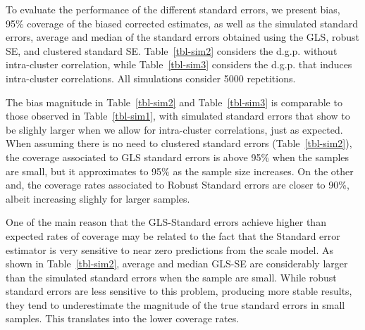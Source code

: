 \documentclass[
  12pt,
  oneside]{article}
\begin{document}
To evaluate the performance of the different standard errors, we present
bias, 95\% coverage of the biased corrected estimates, as well as the
simulated standard errors, average and median of the standard errors
obtained using the GLS, robust SE, and clustered standard SE.
Table~\ref{tbl-sim2} considers the d.g.p. without intra-cluster
correlation, while Table~\ref{tbl-sim3} considers the d.g.p. that
induces intra-cluster correlations. All simulations consider 5000
repetitions.

The bias magnitude in Table~\ref{tbl-sim2} and Table~\ref{tbl-sim3} is
comparable to those observed in Table~\ref{tbl-sim1}, with simulated
standard errors that show to be slighly larger when we allow for
intra-cluster correlations, just as expected. When assuming there is no
need to clustered standard errors (Table~\ref{tbl-sim2}), the coverage
associated to GLS standard errors is above 95\% when the samples are
small, but it approximates to 95\% as the sample size increases. On the
other and, the coverage rates associated to Robust Standard errors are
closer to 90\%, albeit increasing slighly for larger samples.

One of the main reason that the GLS-Standard errors achieve higher than
expected rates of coverage may be related to the fact that the Standard
error estimator is very sensitive to near zero predictions from the
scale model. As shown in Table~\ref{tbl-sim2}, average and median GLS-SE
are considerably larger than the simulated standard errors when the
sample are small. While robust standard errors are less sensitive to
this problem, producing more stable results, they tend to underestimate
the magnitude of the true standard errors in small samples. This
translates into the lower coverage rates.
\end{document}
